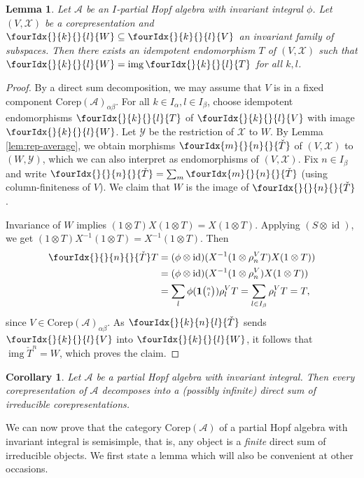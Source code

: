 \documentclass[10pt]{article}
\DeclareMathOperator{\id}{id}
\DeclareMathOperator{\img}{img}
\newcommand{\Corep}{\mathrm{Corep}}
\newcommand{\Grt}[3]{#1{\tiny {\begin{pmatrix} #2\\#3\end{pmatrix}}}}
\newcommand{\UnitC}[2]{\Grt{\mathbf{1}}{#1}{#2}}
\newcommand{\Gr}[5]{\fourIdx{#2}{#4}{#3}{#5}{#1}}%
\newcommand{\Gru}[3]{\Gr{#1}{}{}{#2}{#3}}
\newcommand{\Grd}[3]{\Gr{#1}{#2}{#3}{}{}}
\newtheorem{Lem}[Theorem]{Lemma}
\newtheorem{Cor}[Theorem]{Corollary}
\theoremstyle{definition}
\numberwithin{equation}{section}
\begin{document}
\begin{Lem}
  Let $\mathscr{A}$ be an $I$-partial Hopf algebra with invariant integral $\phi$.
  Let $(V,\mathscr{X})$ be a corepresentation
  and $\Gru{W}{k}{l} \subseteq \Gru{V}{k}{l}$ an invariant family of
  subspaces. Then there exists an idempotent endomorphism $T$ of
  $(V,\mathscr{X})$ such that $\Gru{W}{k}{l}=\img\Gru{T}{k}{l}$ for
  all $k,l$.
\end{Lem}
\begin{proof}
  By a direct sum decomposition, we may assume that $V$ is in a fixed
  component $\Corep(\mathscr{A})_{\alpha\beta}$. For all $k\in
  I_{\alpha},l\in I_{\beta}$, choose idempotent endomorphisms
  $\Gru{T}{k}{l}$ of $\Gru{V}{k}{l}$ with image $\Gru{W}{k}{l}$.  Let
  $\mathscr{Y}$ be the restriction of $\mathscr{X}$ to $W$.  By Lemma
  \ref{lem:rep-average}, we obtain morphisms $\Grd{\check{T}}{m}{n}$
  of $(V,\mathscr{X})$ to $(W,\mathscr{Y})$, which we can also
  interpret as endomorphisms of $(V,\mathscr{X})$.  Fix $n\in
  I_{\beta}$ and write $\Grd{\check{T}}{}{n} = \sum_m
  \Grd{\check{T}}{m}{n}$ (using column-finiteness of $V$). We claim
  that $W$ is the image of $\Grd{\check{T}}{}{n}$.
  
   Invariance of $W$ implies  $(1 \otimes T)X(1
  \otimes T)=X(1\otimes T)$. Applying
 $(S \otimes \id)$, we get   $(1 \otimes T)X^{-1}(1
  \otimes T)=X^{-1}(1\otimes T)$. Then
  \begin{align*}
    \Grd{\check{T}}{}{n} T &= (\phi \otimes \id)(X^{-1}(1 \otimes
    \rho_{n}^{V}T)X(1 \otimes T))  \\ &= 
     (\phi \otimes \id)(X^{-1}(1 \otimes
    \rho_{n}^{V})X(1 \otimes T)) \\&
    =
  \sum_l \phi(\UnitC{n}{l}) \rho^{V}_{l}T  = \sum_{l\in I_{\beta}} \rho^V_lT = T,
  \end{align*}
 since $V\in \Corep(\mathscr{A})_{\alpha\beta}$. As $\Gr{\check{T}}{}{n}{k}{l}$ sends $\Gru{V}{k}{l}$ into $\Gru{W}{k}{l}$, it follows that $\img{\check{T}^{n}}=W$, which proves the claim.
\end{proof}

\begin{Cor}  \label{cor:rep-cosemisimple}
  Let $\mathscr{A}$ be a partial Hopf algebra with invariant integral.  Then
  every corepresentation of $\mathscr{A}$ decomposes into a (possibly infinite) direct
  sum of irreducible corepresentations.
\end{Cor} 

We can now prove that the category $\Corep(\mathscr{A})$ of a partial Hopf algebra with invariant integral is semisimple, that is, any object is a \emph{finite} direct sum of irreducible objects. We first state a lemma which will also be convenient at other occasions.
\end{document}
